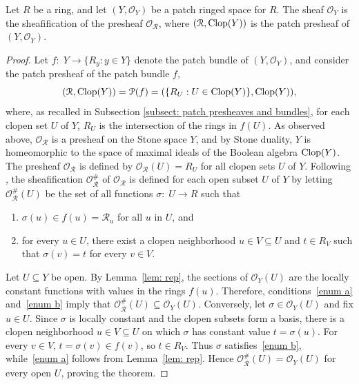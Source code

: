 \documentclass[11pt]{amsart}
\def\O{{\mathcal{O}}}
\begin{document}
\begin{theorem}\label{thm: patch ringed space}
Let $R$ be a ring, and let $(Y,\mathcal O_Y)$ be a patch ringed space for $R$.
The sheaf $\O_Y$ is the sheafification of the presheaf $\O_{\mathcal R}$, where $ (\mathcal R,\mbox{\rm Clop}(Y))$ is the patch presheaf of $(Y,\mathcal O_Y)$.
\end{theorem}
\begin{proof} Let $f\colon\; Y \rightarrow \{R_y:y \in Y\}$ denote the patch bundle of $(Y,\mathcal O_Y)$, and consider the patch presheaf of the patch bundle $f$,
$$(\mathcal R,\mbox{\rm Clop}(Y))= {\mathcal P}(f) = (\{R_U:U \in {\rm Clop}(Y)\},{\rm Clop}(Y)),$$  where, as recalled in Subsection \ref{subsect: patch presheaves and bundles}, for each clopen set $U$ of $Y$, $R_U$ is the intersection of the rings in $f(U)$.
As observed above, $\O_{\mathcal R}$ is a presheaf on the Stone space $Y$, and by Stone duality, $Y$ is homeomorphic to the space of maximal ideals of the Boolean algebra ${\rm Clop}(Y)$. 
The presheaf $\O_{\mathcal R}$ is defined by $\O_{\mathcal R}(U) = R_U$ for all clopen sets $U$ of $Y$.  
Following \cite[\href{https://stacks.math.columbia.edu/tag/007X}{Tag 007X}]{stacks-project}, the sheafification $\O_{\mathcal R}^\#$ of $\O_{\mathcal R}$ is defined for each open subset $U$ of $Y$ by letting $\O_{\mathcal R}^\#(U)$ be the set of all functions 
$\sigma\colon\; U \rightarrow R$ such that
\begin{enumerate}[label=\textup{(\roman{*})}, mode=unboxed]
\item\label{enum a} $\sigma(u) \in f(u) = {{\mathcal R}}_u$ for all $u$ in $U$, and
\item\label{enum b} { for every $u\in U$, there exist a clopen neighborhood $u\in V\subseteq U$ and $t\in R_V$ such that $\sigma(v)=t$ for every $v\in V$.}  
\end{enumerate}

Let $U\subseteq Y$ be open. By Lemma~\ref{lem: rep}, the sections of $\mathcal O_Y(U)$ are  the locally constant functions with values in the rings $f(u)$. Therefore, conditions~\ref{enum a} and~\ref{enum b}  imply that $\mathcal O_{\mathcal R}^{\#}(U)\subseteq\mathcal O_Y(U)$. Conversely, let $\sigma\in\mathcal O_Y(U)$ and fix $u\in U$. Since $\sigma$ is locally constant and the clopen subsets form a basis, there is a clopen neighborhood $u\in V\subseteq U$ on which $\sigma$ has constant value $t=\sigma(u)$. For every $v\in V$, $t=\sigma(v)\in f(v)$, so $t\in R_V$. Thus $\sigma$ satisfies~\ref{enum b}, while~\ref{enum a} follows from Lemma~\ref{lem: rep}. Hence $\mathcal O_{\mathcal R}^{\#}(U)=\mathcal O_Y(U)$ for every open $U$, proving the theorem.
\end{proof}
\end{document}
